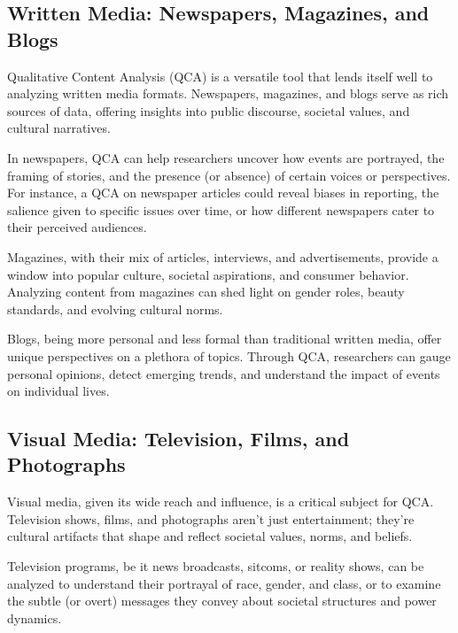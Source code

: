 \documentclass[
  b5paper]{book}
\begin{document}
\hypertarget{written-media-newspapers-magazines-and-blogs}{%
\subsection*{Written Media: Newspapers, Magazines, and Blogs}\label{written-media-newspapers-magazines-and-blogs}}

Qualitative Content Analysis (QCA) is a versatile tool that lends itself well to analyzing written media formats. Newspapers, magazines, and blogs serve as rich sources of data, offering insights into public discourse, societal values, and cultural narratives.

In newspapers, QCA can help researchers uncover how events are portrayed, the framing of stories, and the presence (or absence) of certain voices or perspectives. For instance, a QCA on newspaper articles could reveal biases in reporting, the salience given to specific issues over time, or how different newspapers cater to their perceived audiences.

Magazines, with their mix of articles, interviews, and advertisements, provide a window into popular culture, societal aspirations, and consumer behavior. Analyzing content from magazines can shed light on gender roles, beauty standards, and evolving cultural norms.

Blogs, being more personal and less formal than traditional written media, offer unique perspectives on a plethora of topics. Through QCA, researchers can gauge personal opinions, detect emerging trends, and understand the impact of events on individual lives.

\hypertarget{visual-media-television-films-and-photographs}{%
\subsection*{Visual Media: Television, Films, and Photographs}\label{visual-media-television-films-and-photographs}}

Visual media, given its wide reach and influence, is a critical subject for QCA. Television shows, films, and photographs aren't just entertainment; they're cultural artifacts that shape and reflect societal values, norms, and beliefs.

Television programs, be it news broadcasts, sitcoms, or reality shows, can be analyzed to understand their portrayal of race, gender, and class, or to examine the subtle (or overt) messages they convey about societal structures and power dynamics.
\end{document}
